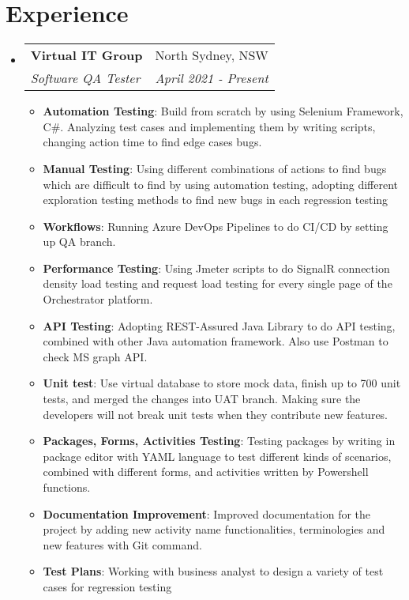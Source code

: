 \documentclass[letterpaper,11pt]{article}
\makeatletter
\newcommand{\resumeItem}[2]{
  \item\small{
    \textbf{#1}{: #2 \vspace{-2pt}}
  }
}
\newcommand{\resumeSubheading}[4]{
  \vspace{-1pt}\item
    \begin{tabular*}{0.97\textwidth}{l@{\extracolsep{\fill}}r}
      \textbf{#1} & #2 \\
      \textit{\small#3} & \textit{\small #4} \\
    \end{tabular*}\vspace{-5pt}
}
\newcommand{\resumeSubHeadingListStart}{\begin{itemize}[leftmargin=*]}
\newcommand{\resumeSubHeadingListEnd}{\end{itemize}}
\newcommand{\resumeItemListStart}{\begin{itemize}}
\newcommand{\resumeItemListEnd}{\end{itemize}\vspace{-5pt}}
\makeatother
\begin{document}
\section{Experience}
  \resumeSubHeadingListStart
    \resumeSubheading
      {Virtual IT Group}{North Sydney, NSW}
      {Software QA Tester}{April 2021 - Present}
      \resumeItemListStart
        \resumeItem{Automation Testing}
          {Build from scratch by using Selenium Framework, C\#. Analyzing test cases and implementing them by writing scripts, changing action time to find edge cases bugs.}
        \resumeItem{Manual Testing}
          {Using different combinations of actions to find bugs which are difficult to find by using automation testing, adopting different exploration testing methods to find new bugs in each regression testing}
        \resumeItem{Workflows}
          {Running Azure DevOps Pipelines to do CI/CD by setting up QA branch.}
        \resumeItem{Performance Testing}
          {Using Jmeter scripts to do SignalR connection density load testing and request load testing for every single page of the Orchestrator platform.}
        \resumeItem{API Testing}
          {Adopting REST-Assured Java Library to do API testing, combined with other Java automation framework. Also use Postman to check MS graph API.}
        \resumeItem{Unit test}
          {Use virtual database to store mock data, finish up to 700 unit tests, and merged the changes into UAT branch. Making sure the developers will not break unit tests when they contribute new features.}
        \resumeItem{Packages, Forms, Activities Testing}
          {Testing packages by writing in package editor with YAML language to test different kinds of scenarios, combined with different forms, and activities written by Powershell functions.}
        \resumeItem{Documentation Improvement}
          {Improved documentation for the project by adding new activity name functionalities, terminologies and new features with Git command.}
        \resumeItem{Test Plans}
          {Working with business analyst to design a variety of test cases for regression testing}
      \resumeItemListEnd

  \resumeSubHeadingListEnd


\end{document}
